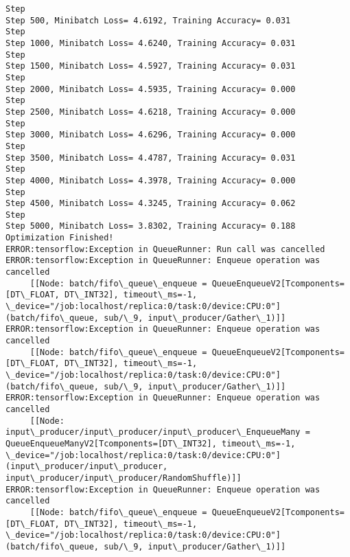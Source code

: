 \documentclass[11pt]{article}
\begin{document}
    \begin{Verbatim}[commandchars=\\\{\}]
Step
Step 500, Minibatch Loss= 4.6192, Training Accuracy= 0.031
Step
Step 1000, Minibatch Loss= 4.6240, Training Accuracy= 0.031
Step
Step 1500, Minibatch Loss= 4.5927, Training Accuracy= 0.031
Step
Step 2000, Minibatch Loss= 4.5935, Training Accuracy= 0.000
Step
Step 2500, Minibatch Loss= 4.6218, Training Accuracy= 0.000
Step
Step 3000, Minibatch Loss= 4.6296, Training Accuracy= 0.000
Step
Step 3500, Minibatch Loss= 4.4787, Training Accuracy= 0.031
Step
Step 4000, Minibatch Loss= 4.3978, Training Accuracy= 0.000
Step
Step 4500, Minibatch Loss= 4.3245, Training Accuracy= 0.062
Step
Step 5000, Minibatch Loss= 3.8302, Training Accuracy= 0.188
Optimization Finished!
ERROR:tensorflow:Exception in QueueRunner: Run call was cancelled
ERROR:tensorflow:Exception in QueueRunner: Enqueue operation was cancelled
	 [[Node: batch/fifo\_queue\_enqueue = QueueEnqueueV2[Tcomponents=[DT\_FLOAT, DT\_INT32], timeout\_ms=-1, \_device="/job:localhost/replica:0/task:0/device:CPU:0"](batch/fifo\_queue, sub/\_9, input\_producer/Gather\_1)]]
ERROR:tensorflow:Exception in QueueRunner: Enqueue operation was cancelled
	 [[Node: batch/fifo\_queue\_enqueue = QueueEnqueueV2[Tcomponents=[DT\_FLOAT, DT\_INT32], timeout\_ms=-1, \_device="/job:localhost/replica:0/task:0/device:CPU:0"](batch/fifo\_queue, sub/\_9, input\_producer/Gather\_1)]]
ERROR:tensorflow:Exception in QueueRunner: Enqueue operation was cancelled
	 [[Node: input\_producer/input\_producer/input\_producer\_EnqueueMany = QueueEnqueueManyV2[Tcomponents=[DT\_INT32], timeout\_ms=-1, \_device="/job:localhost/replica:0/task:0/device:CPU:0"](input\_producer/input\_producer, input\_producer/input\_producer/RandomShuffle)]]
ERROR:tensorflow:Exception in QueueRunner: Enqueue operation was cancelled
	 [[Node: batch/fifo\_queue\_enqueue = QueueEnqueueV2[Tcomponents=[DT\_FLOAT, DT\_INT32], timeout\_ms=-1, \_device="/job:localhost/replica:0/task:0/device:CPU:0"](batch/fifo\_queue, sub/\_9, input\_producer/Gather\_1)]]

    \end{Verbatim}
\end{document}

